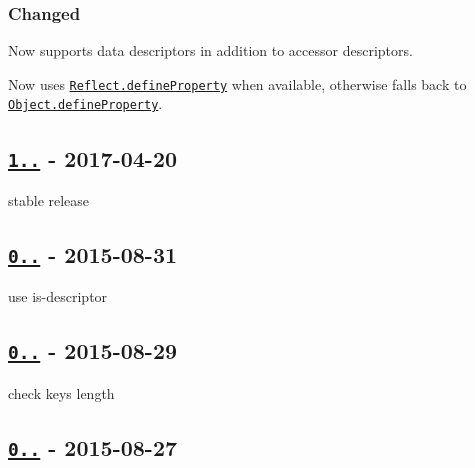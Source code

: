 \subsubsection*{Changed}


\begin{DoxyItemize}
\item Now supports data descriptors in addition to accessor descriptors.
\item Now uses \href{https://developer.mozilla.org/en-US/docs/Web/JavaScript/Reference/Global_Objects/Reflect/defineProperty}{\tt Reflect.\+define\+Property} when available, otherwise falls back to \href{https://developer.mozilla.org/en-US/docs/Web/JavaScript/Reference/Global_Objects/Object/defineProperty}{\tt Object.\+define\+Property}.
\end{DoxyItemize}

\subsection*{\href{https://github.com/jonschlinkert/define-property/compare/0.2.5...1.0.0}{\tt 1..} -\/ 2017-\/04-\/20}


\begin{DoxyItemize}
\item stable release
\end{DoxyItemize}

\subsection*{\href{https://github.com/jonschlinkert/define-property/compare/0.2.3...0.2.5}{\tt 0..} -\/ 2015-\/08-\/31}


\begin{DoxyItemize}
\item use is-\/descriptor
\end{DoxyItemize}

\subsection*{\href{https://github.com/jonschlinkert/define-property/compare/0.2.2...0.2.3}{\tt 0..} -\/ 2015-\/08-\/29}


\begin{DoxyItemize}
\item check keys length
\end{DoxyItemize}

\subsection*{\href{https://github.com/jonschlinkert/define-property/compare/0.2.1...0.2.2}{\tt 0..} -\/ 2015-\/08-\/27}



